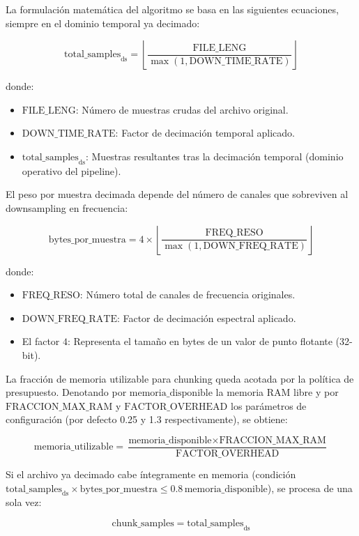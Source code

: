 La formulación matemática del algoritmo se basa en las siguientes ecuaciones, siempre en el dominio temporal ya decimado:

\[
\text{total\_samples}_{\mathrm{ds}} = \left\lfloor \frac{\text{FILE\_LENG}}{\max(1,\text{DOWN\_TIME\_RATE})} \right\rfloor
\]

donde:
\begin{itemize}
    \item $\text{FILE\_LENG}$: Número de muestras crudas del archivo original.
    \item $\text{DOWN\_TIME\_RATE}$: Factor de decimación temporal aplicado.
    \item $\text{total\_samples}_{\mathrm{ds}}$: Muestras resultantes tras la decimación temporal (dominio operativo del pipeline).
\end{itemize}

El peso por muestra decimada depende del número de canales que sobreviven al downsampling en frecuencia:

\[
\text{bytes\_por\_muestra} = 4 \times \left\lfloor \frac{\text{FREQ\_RESO}}{\max(1,\text{DOWN\_FREQ\_RATE})} \right\rfloor
\]

donde:
\begin{itemize}
    \item $\text{FREQ\_RESO}$: Número total de canales de frecuencia originales.
    \item $\text{DOWN\_FREQ\_RATE}$: Factor de decimación espectral aplicado.
    \item El factor $4$: Representa el tamaño en bytes de un valor de punto flotante (32-bit).
\end{itemize}

La fracción de memoria utilizable para chunking queda acotada por la política de presupuesto. Denotando por $\text{memoria\_disponible}$ la memoria RAM libre y por $\text{FRACCION\_MAX\_RAM}$ y $\text{FACTOR\_OVERHEAD}$ los parámetros de configuración (por defecto 0.25 y 1.3 respectivamente), se obtiene:

\[
\text{memoria\_utilizable} = \frac{\text{memoria\_disponible} \times \text{FRACCION\_MAX\_RAM}}{\text{FACTOR\_OVERHEAD}}
\]

Si el archivo ya decimado cabe íntegramente en memoria (condición $\text{total\_samples}_{\mathrm{ds}} \times \text{bytes\_por\_muestra} \le 0.8\,\text{memoria\_disponible}$), se procesa de una sola vez:

\[
\text{chunk\_samples} = \text{total\_samples}_{\mathrm{ds}}
\]

